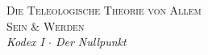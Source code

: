 \documentclass[10pt, openany, oneside]{book}
\renewcommand{\normalsize}{\fontsize{10}{13}\selectfont}
\begin{document}

\thispagestyle{empty}
\vspace*{\fill}
\begin{center}
    {\normalsize\scshape Die Teleologische Theorie von Allem}\\[1.5em]
    {\fontsize{24}{28}\selectfont\scshape Sein \& Werden}\\[0.8em]
    {\normalsize\itshape Kodex I $\cdot$ Der Nullpunkt}
\end{center}
\vspace*{\fill}
\newpage

\end{document}
